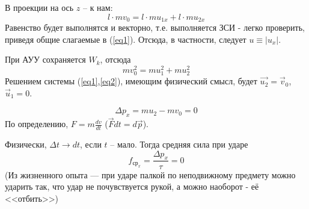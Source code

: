 \documentclass[a5paper,10pt]{article}
\begin{document}
В проекции на ось $z$ -- к нам:
\begin{equation}
    l\cdot mv_0 = l\cdot mu_{1x}+l\cdot mu_{2x}
\end{equation}
Равенство будет выполнятся и векторно, т.е. выполняется ЗСИ - легко проверить, приведя общие слагаемые в (\ref{eq1}). Отсюда, в частности, следует $u\equiv|u_x|$.

При АУУ сохраняется $W_k$, отсюда
\begin{equation}
    \label{eq2}
    mv_0^2=mu_1^2+mu_2^2
\end{equation}
Решением системы (\ref{eq1},\ref{eq2}), имеющим физический смысл, будет $\vec{u_2}=\vec{v}_0$, $\vec{u}_1=0$.

\begin{equation}
    \Delta p_x=mu_2-mv_0=0
\end{equation}
По определению, $ F=m\frac{dv}{dt}$ ($\vec{F}dt=d\vec{p}$).

Физически, $\Delta t \to dt$, если $t$ -- мало. Тогда средняя сила при ударе
\begin{equation}
    f_{\text{ср}_x}=\frac{\Delta p_x}{\tau}=0
\end{equation}
(Из жизненного опыта --- при ударе палкой по неподвижному предмету можно ударить так, что удар не почувствуется рукой, а можно наоборот - её <<отбить>>)
\end{document}

